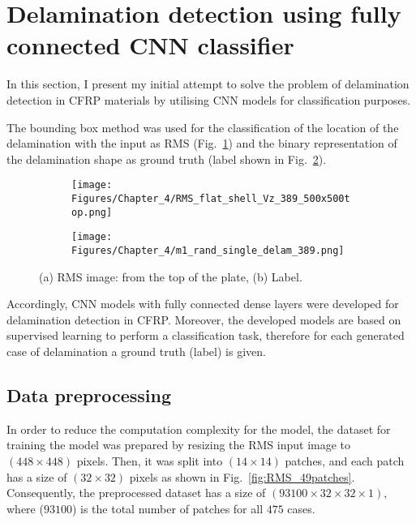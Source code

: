 \section{Delamination detection using fully connected CNN classifier}
\label{sec42}

In this section, I present my initial attempt to solve the problem of delamination detection in CFRP materials by utilising CNN models for classification purposes.

The bounding box method was used for the classification of the location of the delamina\-tion with the input as RMS (Fig.~\ref{fig:RMS_14}) and the binary representation of the delamination shape as ground truth (label shown in Fig.~\ref{fig:label_14}).
\begin{figure} [!ht]
	\centering
	\begin{subfigure}[b]{0.47\textwidth}
		\centering
		\texttt{[image: Figures/Chapter\_4/RMS\_flat\_shell\_Vz\_389\_500x500top.png]}
		\caption{}
		\label{fig:RMS_14}
	\end{subfigure}
	\hfill
	\begin{subfigure}[b]{0.47\textwidth}
		\centering
		\texttt{[image: Figures/Chapter\_4/m1\_rand\_single\_delam\_389.png]}
		\caption{}
		\label{fig:label_14}
	\end{subfigure}
	\caption{(a) RMS image: from the top of the plate, (b) Label.}
	\label{fig:RMS_GT}
\end{figure} 

Accordingly, CNN models with fully connected dense layers were developed for delamina\-tion detection in CFRP.
Moreover, the developed models are based on supervised learning to perform a classification task, therefore for each generated case of delamination a ground truth (label) is given.
 
\subsection{Data preprocessing}
\label{sec421}
In order to reduce the computation complexity for the model, the dataset for training the model was prepared by resizing the RMS input image to \((448\times 448)\) pixels.  
Then, it was split into \((14\times 14)\) patches, and each patch has a size of \((32\times 32)\) pixels as shown in Fig.~\ref{fig:RMS_49patches}.
Consequently, the preprocessed dataset has a size of \((93100\times 32\times 32 \times 1)\), where (\(93100\)) is the total number of patches for all \(475\) cases.

